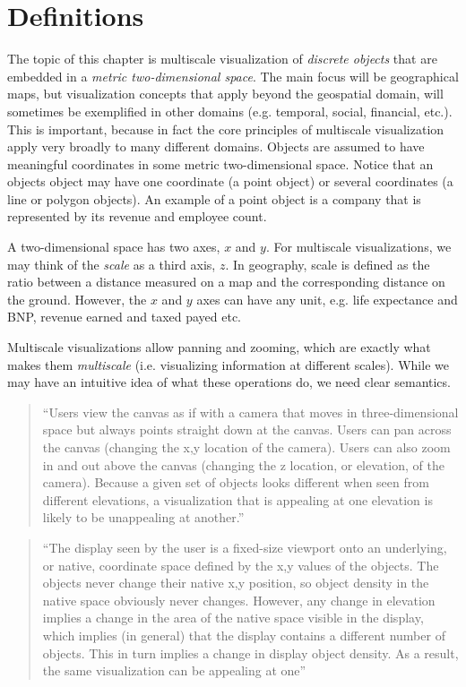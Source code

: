 \documentclass[11pt, oneside]{report}   	%
\begin{document}
\section{Definitions}

The topic of this chapter is multiscale visualization of \emph{discrete objects} that are embedded in a \emph{metric two-dimensional space}. The main focus will be geographical maps, but visualization concepts that apply beyond the geospatial domain, will sometimes be exemplified in other domains (e.g. temporal, social, financial, etc.). This is important, because in fact the core principles of multiscale visualization apply very broadly to many different domains. Objects are assumed to have meaningful coordinates in some metric two-dimensional space. Notice that an objects object may have one coordinate (a point object) or several coordinates (a line or polygon objects). An example of a point object is a company that is represented by its revenue and employee count.

A two-dimensional space has two axes, $x$ and $y$. For multiscale visualizations, we may think of the \emph{scale} as a third axis, $z$. In geography, scale is defined as the ratio between a distance measured on a map and the corresponding distance on the ground. However, the $x$ and $y$ axes can have any unit, e.g. life expectance and BNP, revenue earned and taxed payed etc.

Multiscale visualizations allow panning and zooming, which are exactly what makes them \emph{multiscale} (i.e. visualizing information at different scales).  While we may have an intuitive idea of what these operations do, we need clear semantics.

\begin{quote}
``Users view the canvas as if with a camera that moves in three-dimensional space but always points straight down at the canvas. Users can pan across the canvas (changing the x,y location of the camera). Users can also zoom in and out above the canvas (changing the z location, or elevation, of the camera). Because a given set of objects looks different when seen from different elevations, a visualization that is appealing at one elevation is likely to be unappealing at another.''~\cite{woodruff1998constant}
\end{quote}

\begin{quote}
``The display seen by the user is a fixed-size viewport onto an underlying, or native, coordinate space defined by the x,y values of the objects. The objects never change their native x,y position, so object density in the native space obviously never changes. However, any change in elevation implies a change in the area of the native space visible in the display, which implies (in general) that the display contains a different number of objects. This in turn implies a change in display object density. As a result, the same visualization can be appealing at one''
\end{quote}
\end{document}
